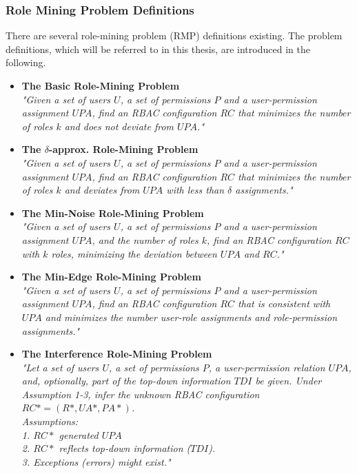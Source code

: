     \subsubsection{Role Mining Problem Definitions}
    \label{sec:roleMiningProblems}
    There are several role-mining problem (RMP) definitions existing. The problem definitions, which will be referred to in this thesis, are introduced in the following.
    \begin{itemize}
        \item \textbf{The Basic Role-Mining Problem}\cite{Vaidya:2007}\\
        \textit{"Given a set of users $U$, a set of permissions $P$ and a user-permission assignment $UPA$, find an RBAC configuration $RC$ that minimizes the number of roles $k$ and does not deviate from $UPA$."}
        \item \textbf{The $\delta$-approx. Role-Mining Problem}\cite{Vaidya:2007}\\
        \textit{"Given a set of users $U$, a set of permissions $P$ and a user-permission assignment $UPA$, find an RBAC configuration $RC$ that minimizes the number of roles $k$ and deviates from $UPA$ with less than $\delta$ assignments."}
        \item \textbf{The Min-Noise Role-Mining Problem}\cite{Vaidya:2007}\\
        \textit{"Given a set of users $U$, a set of permissions $P$ and a user-permission assignment $UPA$, and the number of roles $k$, find an RBAC configuration $RC$ with $k$ roles, minimizing the deviation between $UPA$ and $RC$."}
        \item \textbf{The Min-Edge Role-Mining Problem}\cite{4497438}\\
        \textit{"Given a set of users $U$, a set of permissions $P$ and a user-permission assignment $UPA$, find an RBAC configuration $RC$ that is consistent with $UPA$ and minimizes the number user-role assignments and role-permission assignments."}
        \item \textbf{The Interference Role-Mining Problem}\cite{Frank:2013}\\
        \textit{"Let a set of users $U$, a set of permissions $P$, a user-permission relation $UPA$, and, optionally, part of the top-down information $TDI$ be given. Under Assumption 1-3, infer the unknown RBAC configuration $RC*=(R*, UA*, PA*)$.\\
        Assumptions:\\
        1. $RC*$ generated $UPA$\\
        2. $RC*$ reflects top-down information ($TDI$).\\
        3. Exceptions (errors) might exist."}
    \end{itemize}
